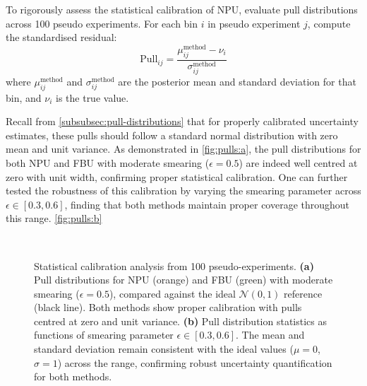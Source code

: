     To rigorously assess the statistical calibration of NPU, evaluate pull distributions across 100 pseudo experiments.
    For each bin $i$ in pseudo experiment $j$, compute the standardised residual:
    \[
        \text{Pull}_{ij} = \frac{\mu^{\text{method}}_{ij} - \nu_i}{\sigma^{\text{method}}_{ij}}
    \]
    where $\mu^{\text{method}}_{ij}$ and $\sigma^{\text{method}}_{ij}$ are the posterior mean and standard deviation for that bin, and $\nu_i$ is the true value.
    
    Recall from \cref{subsubsec:pull-distributions} that for properly calibrated uncertainty estimates, these pulls should follow a standard normal distribution with zero mean and unit variance.
    As demonstrated in \cref{fig:pulls:a}, the pull distributions for both NPU and FBU with moderate smearing ($\epsilon = 0.5$) are indeed well centred at zero with unit width, confirming proper statistical calibration.
    One can further tested the robustness of this calibration by varying the smearing parameter across $\epsilon \in [0.3, 0.6]$, finding that both methods maintain proper coverage throughout this range.
    \cref{fig:pulls:b} 

\begin{figure}
\centering
{} 
 \\
\caption[Statistical calibration analysis for NPU and FBU]{Statistical calibration analysis from 100 pseudo-experiments.
\textbf{(a)} Pull distributions for NPU (orange) and FBU (green) with moderate smearing ($\epsilon = 0.5$), compared against the ideal $\mathcal{N}(0,1)$ reference (black line). 
Both methods show proper calibration with pulls centred at zero and unit variance.
\textbf{(b)} Pull distribution statistics as functions of smearing parameter $\epsilon \in [0.3, 0.6]$. 
The mean and standard deviation remain consistent with the ideal values ($\mu = 0$, $\sigma = 1$) across the range, confirming robust uncertainty quantification for both methods.\footnotemark
}
\label{fig:pulls}
\end{figure}
